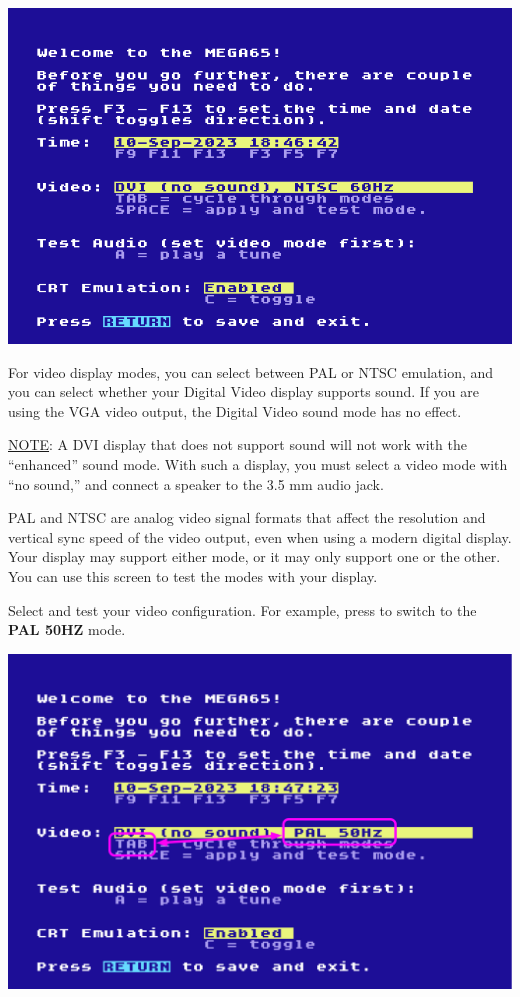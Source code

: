 \begin{center}
  \includegraphics[width=0.7\linewidth]{images/img011_final_boot_01.png}
\end{center}

For video display modes, you can select between PAL or NTSC emulation, and you can select whether your Digital Video display supports sound. If you are using the VGA video output, the Digital Video sound mode has no effect.

\underline{NOTE}: A DVI display that does not support sound will not work with the ``enhanced'' sound mode. With such a display, you must select a video mode with ``no sound,'' and connect a speaker to the 3.5 mm audio jack.

PAL and NTSC are analog video signal formats that affect the resolution and vertical sync speed of the video output, even when using a modern digital display. Your display may support either mode, or it may only support one or the other. You can use this screen to test the modes with your display.

Select and test your video configuration. For example, press  to switch to the {\bf PAL 50HZ} mode.
\begin{center}
  \includegraphics[width=0.7\linewidth]{images/img011_final_boot_02.png}
\end{center}

